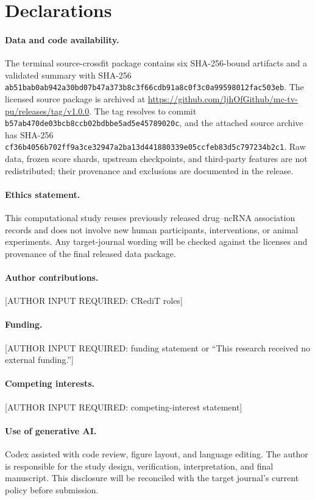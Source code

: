 \documentclass[preprint,review,12pt]{elsarticle}
\newcommand{\AuthorPending}[1]{\textcolor{pendingred}{[AUTHOR INPUT REQUIRED: #1]}}
\begin{document}
\section*{Declarations}

\paragraph{Data and code availability.}
The terminal source-crossfit package contains six SHA-256-bound artifacts and a
validated summary with SHA-256
\nolinkurl{ab51bab0ab942a30bd07b47a373b8c3f66cdb91a8c0f3c0a99598012fac503eb}.
The licensed source package is archived at
\url{https://github.com/ljhOfGithub/mc-tv-pu/releases/tag/v1.0.0}.
The tag resolves to commit
\nolinkurl{b57ab470de03bcb8ccb02bdbbe5ad5e45789020c}, and the attached source
archive has SHA-256
\nolinkurl{cf36b4056b702ff9a3ce32947a2ba13d441880339e05ccfeb83d5c797234b2c1}.
Raw data, frozen score shards, upstream checkpoints, and third-party features
are not redistributed; their provenance and exclusions are documented in the
release.

\paragraph{Ethics statement.}
This computational study reuses previously released drug--ncRNA association
records and does not involve new human participants, interventions, or animal
experiments. Any target-journal wording will be checked against the licenses
and provenance of the final released data package.

\paragraph{Author contributions.}
\AuthorPending{CRediT roles}

\paragraph{Funding.}
\AuthorPending{funding statement or ``This research received no external
funding.''}

\paragraph{Competing interests.}
\AuthorPending{competing-interest statement}

\paragraph{Use of generative AI.}
Codex assisted with code review, figure layout, and language editing. The
author is responsible for the study design, verification, interpretation, and
final manuscript. This disclosure will be reconciled with the target journal's
current policy before submission.

\begin{small}


\end{small}
\end{document}
